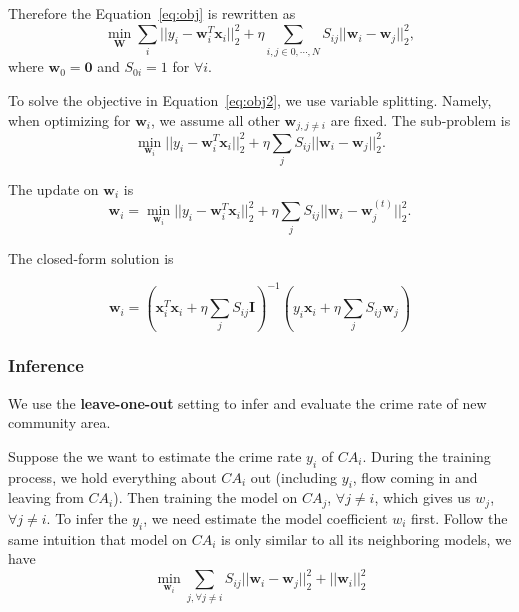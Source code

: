 Therefore the Equation~\ref{eq:obj} is rewritten as
\begin{equation}
\label{eq:obj2}
\min_{\mathbf{W}}  \sum_i || y_i - \mathbf{w}_i^T \mathbf{x}_i ||_2^2 + \eta \sum_{i,j \in 0, \cdots, N} S_{ij} || \mathbf{w}_i - \mathbf{w}_j ||_2^2,
\end{equation}
where $\mathbf{w}_0 = \mathbf{0}$ and $S_{0i} = 1$ for $\forall i$.


To solve the objective in Equation~\ref{eq:obj2}, we use variable splitting. Namely, when optimizing for $\mathbf{w}_i$, we assume all other $\mathbf{w}_{j, j\neq i}$ are fixed. The sub-problem is
\begin{equation}
\label{eq:subobj}
\min_{\mathbf{w}_i}   ||y_i - \mathbf{w}_i^T \mathbf{x}_i ||_2^2 + \eta \sum_j S_{ij}|| \mathbf{w}_i - \mathbf{w}_j||_2^2.
\end{equation}



The update on $\mathbf{w}_i$ is
\[
\mathbf{w}_i = \min_{\mathbf{w}_i}   ||y_i - \mathbf{w}_i^T \mathbf{x}_i ||_2^2 + \eta \sum_j S_{ij} || \mathbf{w}_i - \mathbf{w}_j^{(t)} ||_2^2.
\]

The closed-form solution is

\begin{equation}
\mathbf{w}_i = (\mathbf{x}_i^T \mathbf{x}_i + \eta \sum_j S_{ij} \mathbf{I} )^{-1} (y_i \mathbf{x}_i + \eta \sum_j S_{ij} \mathbf{w}_j) 
\end{equation}


\subsubsection{Inference}

We use the \textbf{leave-one-out} setting to infer and evaluate the crime rate of new community area. 

Suppose the we want to estimate the crime rate $y_i$ of $CA_i$. During the training process, we hold everything about $CA_i$ out (including $y_i$, flow coming in and leaving from $CA_i$). Then training the model on $CA_j$, $\forall j \neq i$, which gives us $w_j$, $\forall j \neq i$. To infer the $y_i$, we need estimate the model coefficient $w_i$ first. Follow the same intuition that model on $CA_i$ is only similar to all its neighboring models, we have
\begin{equation}
\min_{\mathbf{w}_i} \sum_{j, \forall j \neq i} S_{ij} || \mathbf{w}_i - \mathbf{w}_j ||_2^2 + || \mathbf{w}_i ||_2^2
\end{equation}

